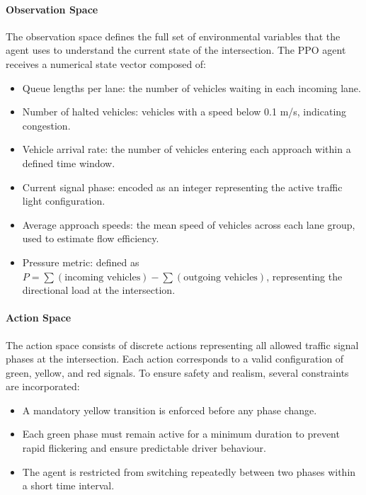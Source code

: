 \documentclass[11pt, a4paper]{report}
\begin{document}
\paragraph{Observation Space}

The observation space defines the full set of environmental variables that the agent uses to understand the current state of the intersection. The PPO agent receives a numerical state vector composed of:

\begin{itemize}
    \item Queue lengths per lane: the number of vehicles waiting in each incoming lane.
    \item Number of halted vehicles: vehicles with a speed below 0.1 m/s, indicating congestion.
    \item Vehicle arrival rate: the number of vehicles entering each approach within a defined time window.
    \item Current signal phase: encoded as an integer representing the active traffic light configuration.
    \item Average approach speeds: the mean speed of vehicles across each lane group, used to estimate flow efficiency.
    \item Pressure metric: defined as $P = \sum(\text{incoming vehicles}) - \sum(\text{outgoing vehicles})$, representing the directional load at the intersection.
\end{itemize}

\paragraph{Action Space}

The action space consists of discrete actions representing all allowed traffic signal phases at the intersection. Each action corresponds to a valid configuration of green, yellow, and red signals. To ensure safety and realism, several constraints are incorporated:

\begin{itemize}
    \item A mandatory yellow transition is enforced before any phase change.
    \item Each green phase must remain active for a minimum duration to prevent rapid flickering and ensure predictable driver behaviour.
    \item The agent is restricted from switching repeatedly between two phases within a short time interval.
\end{itemize}
\end{document}
